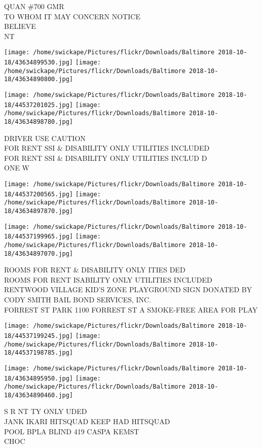 \documentclass[10pt,letterpaper]{article}
\begin{document}
QUAN \#700 GMR\\
TO WHOM IT MAY CONCERN NOTICE\\
BELIEVE\\
NT
\pagebreak

\texttt{[image: /home/swickape/Pictures/flickr/Downloads/Baltimore 2018-10-18/43634899530.jpg]}
\texttt{[image: /home/swickape/Pictures/flickr/Downloads/Baltimore 2018-10-18/43634890800.jpg]}

\texttt{[image: /home/swickape/Pictures/flickr/Downloads/Baltimore 2018-10-18/44537201025.jpg]}
\texttt{[image: /home/swickape/Pictures/flickr/Downloads/Baltimore 2018-10-18/43634898780.jpg]}

DRIVER USE CAUTION\\
FOR RENT SSI \& DISABILITY ONLY UTILITIES INCLUDED\\
FOR RENT SSI \& DISABILITY ONLY UTILITIES INCLUD D\\
ONE W
\pagebreak

\texttt{[image: /home/swickape/Pictures/flickr/Downloads/Baltimore 2018-10-18/44537200565.jpg]}
\texttt{[image: /home/swickape/Pictures/flickr/Downloads/Baltimore 2018-10-18/43634897870.jpg]}

\texttt{[image: /home/swickape/Pictures/flickr/Downloads/Baltimore 2018-10-18/44537199965.jpg]}
\texttt{[image: /home/swickape/Pictures/flickr/Downloads/Baltimore 2018-10-18/43634897070.jpg]}

ROOMS FOR RENT \& DISABILITY ONLY ITIES DED\\
ROOMS FOR RENT ISABILITY ONLY UTILITIES INCLUDED\\
RENTWOOD VILLAGE KID'S ZONE PLAYGROUND SIGN DONATED BY CODY SMITH BAIL BOND SERVICES, INC.\\
FORREST ST PARK 1100 FORREST ST A SMOKE{-}FREE AREA FOR PLAY
\pagebreak

\texttt{[image: /home/swickape/Pictures/flickr/Downloads/Baltimore 2018-10-18/44537199245.jpg]}
\texttt{[image: /home/swickape/Pictures/flickr/Downloads/Baltimore 2018-10-18/44537198785.jpg]}

\texttt{[image: /home/swickape/Pictures/flickr/Downloads/Baltimore 2018-10-18/43634895950.jpg]}
\texttt{[image: /home/swickape/Pictures/flickr/Downloads/Baltimore 2018-10-18/43634890460.jpg]}

S R NT TY ONLY UDED\\
JANK IKARI HITSQUAD KEEP HAD HITSQUAD\\
POOL BPLA BLIND 419 CASPA KEMST\\
CHOC
\pagebreak
\end{document}
